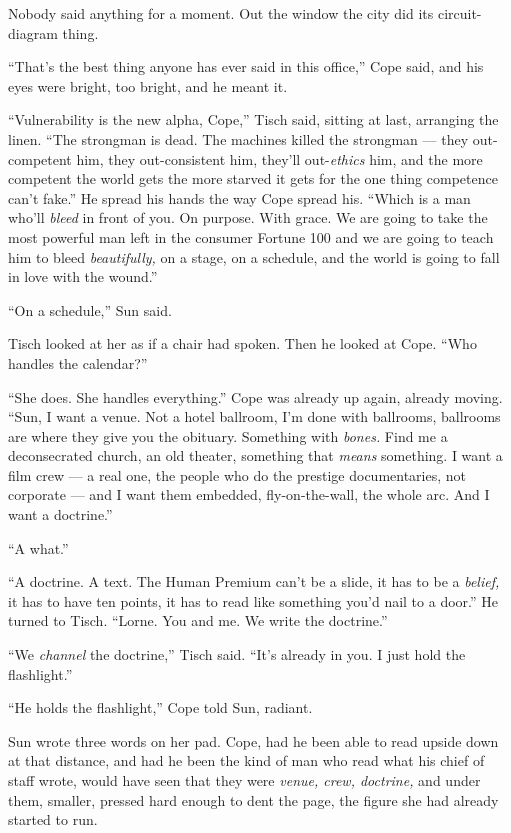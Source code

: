 \documentclass[11pt,openany]{book}
\begin{document}
Nobody said anything for a moment. Out the window the city did its circuit-diagram thing.

``That's the best thing anyone has ever said in this office,'' Cope said, and his eyes were bright, too bright, and he meant it.

``Vulnerability is the new alpha, Cope,'' Tisch said, sitting at last, arranging the linen. ``The strongman is dead. The machines killed the strongman --- they out-competent him, they out-consistent him, they'll out-\textit{ethics} him, and the more competent the world gets the more starved it gets for the one thing competence can't fake.'' He spread his hands the way Cope spread his. ``Which is a man who'll \textit{bleed} in front of you. On purpose. With grace. We are going to take the most powerful man left in the consumer Fortune 100 and we are going to teach him to bleed \textit{beautifully,} on a stage, on a schedule, and the world is going to fall in love with the wound.''

``On a schedule,'' Sun said.

Tisch looked at her as if a chair had spoken. Then he looked at Cope. ``Who handles the calendar?''

``She does. She handles everything.'' Cope was already up again, already moving. ``Sun, I want a venue. Not a hotel ballroom, I'm done with ballrooms, ballrooms are where they give you the obituary. Something with \textit{bones.} Find me a deconsecrated church, an old theater, something that \textit{means} something. I want a film crew --- a real one, the people who do the prestige documentaries, not corporate --- and I want them embedded, fly-on-the-wall, the whole arc. And I want a doctrine.''

``A what.''

``A doctrine. A text. The Human Premium can't be a slide, it has to be a \textit{belief,} it has to have ten points, it has to read like something you'd nail to a door.'' He turned to Tisch. ``Lorne. You and me. We write the doctrine.''

``We \textit{channel} the doctrine,'' Tisch said. ``It's already in you. I just hold the flashlight.''

``He holds the flashlight,'' Cope told Sun, radiant.

Sun wrote three words on her pad. Cope, had he been able to read upside down at that distance, and had he been the kind of man who read what his chief of staff wrote, would have seen that they were \textit{venue, crew, doctrine,} and under them, smaller, pressed hard enough to dent the page, the figure she had already started to run.
\end{document}
